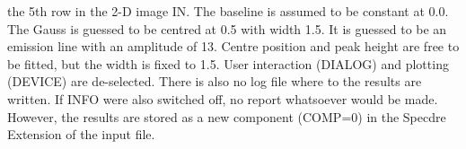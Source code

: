 {{{         the 5th row in the 2-D image IN. The baseline is assumed to be
         constant at 0.0. The Gauss is guessed to be centred at 0.5 with
         width 1.5. It is guessed to be an emission line with an
         amplitude of 13. Centre position and peak height are free to be
         fitted, but the width is fixed to 1.5. User interaction
         (DIALOG) and plotting (DEVICE) are de-selected. There is also no
         log file where to the results are written. If INFO were also
         switched off, no report whatsoever would be made. However, the
         results are stored as a new component (COMP=0) in the Specdre
         Extension of the input file.
      }
   }
}

